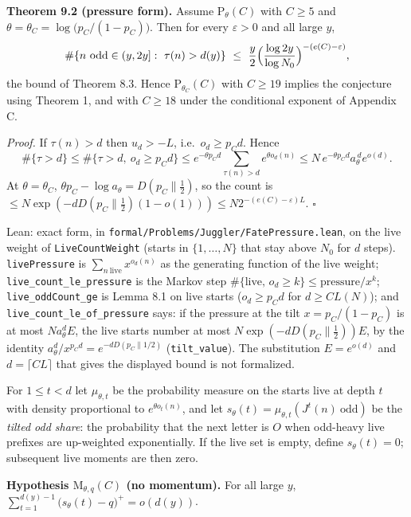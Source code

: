 \documentclass[11pt,a4paper]{article}
\begin{document}
\textbf{Theorem 9.2 (pressure form).} Assume \(\mathrm P_\theta(C)\)
with \(C\ge 5\) and \(\theta=\theta_C=\log\bigl(p_C/(1-p_C)\bigr)\).
Then for every \(\varepsilon>0\) and all large \(y\), \[
\#\{n\ \mathrm{odd}\in(y,2y]:\ \tau(n)>d(y)\}
\ \le\ \frac y2\Bigl(\frac{\log 2y}{\log N_0}\Bigr)^{-(e(C)-\varepsilon)},
\] the bound of Theorem 8.3. Hence \(\mathrm P_{\theta_C}(C)\) with
\(C\ge 19\) implies the conjecture using Theorem 1, and with \(C\ge 18\)
under the conditional exponent of Appendix C.

\emph{Proof.} If \(\tau(n)>d\) then \(u_d>-L\), i.e.~\(o_d\ge p_Cd\).
Hence \[
\#\{\tau>d\}\le\#\{\tau>d,\ o_d\ge p_Cd\}
\le e^{-\theta p_Cd}\sum_{\tau(n)>d}e^{\theta o_d(n)}
\le N\,e^{-\theta p_Cd}a_\theta^{\,d}e^{o(d)} .
\] At \(\theta=\theta_C\),
\(\theta p_C-\log a_\theta=D(p_C\|\tfrac12)\), so the count is
\(\le N\exp(-dD(p_C\|\tfrac12)(1-o(1)))\le N2^{-(e(C)-\varepsilon)L}\).
\(\square\)

Lean: exact form, in
\texttt{\nolinkurl{formal/Problems/Juggler/FatePressure.lean}}, on the
live weight of \texttt{\nolinkurl{LiveCountWeight}} (starts in
\(\{1,\dots,N\}\) that stay above \(N_0\) for \(d\) steps).
\texttt{\nolinkurl{livePressure}} is
\(\sum_{n\ \mathrm{live}}x^{o_d(n)}\) as the generating function of the
live weight; \texttt{\nolinkurl{live_count_le_pressure}} is the Markov
step \(\#\{\text{live},\,o_d\ge k\}\le\text{pressure}/x^k\);
\texttt{\nolinkurl{live_oddCount_ge}} is Lemma 8.1 on live starts
(\(o_d\ge p_Cd\) for \(d\ge CL(N)\)); and
\texttt{\nolinkurl{live_count_le_of_pressure}} says: if the pressure at
the tilt \(x=p_C/(1-p_C)\) is at most \(Na_\theta^dE\), the live starts
number at most \(N\exp(-dD(p_C\|\tfrac12))E\), by the identity
\(a_\theta^d/x^{p_Cd}=e^{-dD(p_C\|1/2)}\)
(\texttt{\nolinkurl{tilt_value}}). The substitution \(E=e^{o(d)}\) and
\(d=\lceil CL\rceil\) that gives the displayed bound is not formalized.

For \(1\le t<d\) let \(\mu_{\theta,t}\) be the probability measure on
the starts live at depth \(t\) with density proportional to
\(e^{\theta o_t(n)}\), and let
\(s_\theta(t)=\mu_{\theta,t}(J^t(n)\ \text{odd})\) be the \emph{tilted
odd share}: the probability that the next letter is \(O\) when odd-heavy
live prefixes are up-weighted exponentially. If the live set is empty,
define \(s_\theta(t)=0\); subsequent live moments are then zero.

\textbf{Hypothesis \(\mathrm M_{\theta,q}(C)\) (no momentum).} For all
large \(y\), \(\sum_{t=1}^{d(y)-1}\bigl(s_\theta(t)-q\bigr)^+=o(d(y))\).
\end{document}
